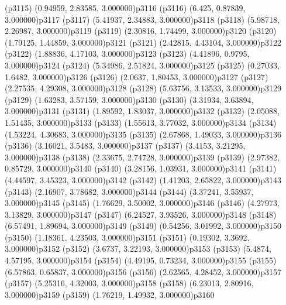 \psdot(p3115)
\psPoint(0.94959, 2.83585, 3.000000){p3116}
\psdot(p3116)
\psPoint(6.425, 0.87839, 3.000000){p3117}
\psdot(p3117)
\psPoint(5.41937, 2.34883, 3.000000){p3118}
\psdot(p3118)
\psPoint(5.98718, 2.26987, 3.000000){p3119}
\psdot(p3119)
\psPoint(2.30816, 1.74499, 3.000000){p3120}
\psdot(p3120)
\psPoint(1.79125, 1.44859, 3.000000){p3121}
\psdot(p3121)
\psPoint(2.42815, 4.43104, 3.000000){p3122}
\psdot(p3122)
\psPoint(1.88836, 4.17103, 3.000000){p3123}
\psdot(p3123)
\psPoint(4.41896, 0.9795, 3.000000){p3124}
\psdot(p3124)
\psPoint(5.34986, 2.51824, 3.000000){p3125}
\psdot(p3125)
\psPoint(0.27033, 1.6482, 3.000000){p3126}
\psdot(p3126)
\psPoint(2.0637, 1.80453, 3.000000){p3127}
\psdot(p3127)
\psPoint(2.27535, 4.29308, 3.000000){p3128}
\psdot(p3128)
\psPoint(5.63756, 3.13533, 3.000000){p3129}
\psdot(p3129)
\psPoint(1.63283, 3.57159, 3.000000){p3130}
\psdot(p3130)
\psPoint(3.31934, 3.63894, 3.000000){p3131}
\psdot(p3131)
\psPoint(1.89592, 1.83037, 3.000000){p3132}
\psdot(p3132)
\psPoint(2.05088, 1.51435, 3.000000){p3133}
\psdot(p3133)
\psPoint(1.55613, 3.77032, 3.000000){p3134}
\psdot(p3134)
\psPoint(1.53224, 4.30683, 3.000000){p3135}
\psdot(p3135)
\psPoint(2.67868, 1.49033, 3.000000){p3136}
\psdot(p3136)
\psPoint(3.16021, 3.5483, 3.000000){p3137}
\psdot(p3137)
\psPoint(3.4153, 3.21295, 3.000000){p3138}
\psdot(p3138)
\psPoint(2.33675, 2.74728, 3.000000){p3139}
\psdot(p3139)
\psPoint(2.97382, 0.85729, 3.000000){p3140}
\psdot(p3140)
\psPoint(3.28156, 1.03931, 3.000000){p3141}
\psdot(p3141)
\psPoint(4.44597, 3.45323, 3.000000){p3142}
\psdot(p3142)
\psPoint(1.41203, 2.65822, 3.000000){p3143}
\psdot(p3143)
\psPoint(2.16907, 3.78682, 3.000000){p3144}
\psdot(p3144)
\psPoint(3.37241, 3.55937, 3.000000){p3145}
\psdot(p3145)
\psPoint(1.76629, 3.50002, 3.000000){p3146}
\psdot(p3146)
\psPoint(4.27973, 3.13829, 3.000000){p3147}
\psdot(p3147)
\psPoint(6.24527, 3.93526, 3.000000){p3148}
\psdot(p3148)
\psPoint(6.57491, 1.89694, 3.000000){p3149}
\psdot(p3149)
\psPoint(0.54256, 3.01992, 3.000000){p3150}
\psdot(p3150)
\psPoint(1.18361, 4.23503, 3.000000){p3151}
\psdot(p3151)
\psPoint(0.19302, 3.3692, 3.000000){p3152}
\psdot(p3152)
\psPoint(3.6737, 3.22193, 3.000000){p3153}
\psdot(p3153)
\psPoint(5.4874, 4.57195, 3.000000){p3154}
\psdot(p3154)
\psPoint(4.49195, 0.73234, 3.000000){p3155}
\psdot(p3155)
\psPoint(6.57863, 0.65837, 3.000000){p3156}
\psdot(p3156)
\psPoint(2.62565, 4.28452, 3.000000){p3157}
\psdot(p3157)
\psPoint(5.25316, 4.32003, 3.000000){p3158}
\psdot(p3158)
\psPoint(6.23013, 2.80916, 3.000000){p3159}
\psdot(p3159)
\psPoint(1.76219, 1.49932, 3.000000){p3160}
